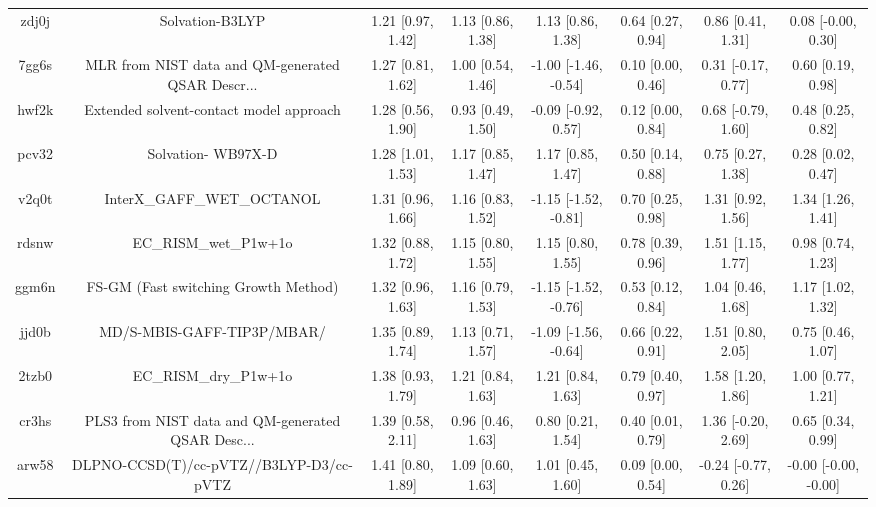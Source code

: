 \documentclass{article}
\begin{document}
\begin{center}
\begin{longtable}{|cccccccc|}
 zdj0j &                                    Solvation-B3LYP &  1.21 [0.97, 1.42] &  1.13 [0.86, 1.38] &     1.13 [0.86, 1.38] &  0.64 [0.27, 0.94] &    0.86 [0.41, 1.31] &    0.08 [-0.00, 0.30] \\
 7gg6s &  MLR from NIST data and QM-generated QSAR Descr... &  1.27 [0.81, 1.62] &  1.00 [0.54, 1.46] &  -1.00 [-1.46, -0.54] &  0.10 [0.00, 0.46] &   0.31 [-0.17, 0.77] &     0.60 [0.19, 0.98] \\
 hwf2k &            Extended solvent-contact model approach &  1.28 [0.56, 1.90] &  0.93 [0.49, 1.50] &   -0.09 [-0.92, 0.57] &  0.12 [0.00, 0.84] &   0.68 [-0.79, 1.60] &     0.48 [0.25, 0.82] \\
 pcv32 &                                 Solvation- WB97X-D &  1.28 [1.01, 1.53] &  1.17 [0.85, 1.47] &     1.17 [0.85, 1.47] &  0.50 [0.14, 0.88] &    0.75 [0.27, 1.38] &     0.28 [0.02, 0.47] \\
 v2q0t &                         InterX\_GAFF\_WET\_OCTANOL &  1.31 [0.96, 1.66] &  1.16 [0.83, 1.52] &  -1.15 [-1.52, -0.81] &  0.70 [0.25, 0.98] &    1.31 [0.92, 1.56] &     1.34 [1.26, 1.41] \\
 rdsnw &                              EC\_RISM\_wet\_P1w+1o &  1.32 [0.88, 1.72] &  1.15 [0.80, 1.55] &     1.15 [0.80, 1.55] &  0.78 [0.39, 0.96] &    1.51 [1.15, 1.77] &     0.98 [0.74, 1.23] \\
 ggm6n &               FS-GM (Fast switching Growth Method) &  1.32 [0.96, 1.63] &  1.16 [0.79, 1.53] &  -1.15 [-1.52, -0.76] &  0.53 [0.12, 0.84] &    1.04 [0.46, 1.68] &     1.17 [1.02, 1.32] \\
 jjd0b &                         MD/S-MBIS-GAFF-TIP3P/MBAR/ &  1.35 [0.89, 1.74] &  1.13 [0.71, 1.57] &  -1.09 [-1.56, -0.64] &  0.66 [0.22, 0.91] &    1.51 [0.80, 2.05] &     0.75 [0.46, 1.07] \\
 2tzb0 &                              EC\_RISM\_dry\_P1w+1o &  1.38 [0.93, 1.79] &  1.21 [0.84, 1.63] &     1.21 [0.84, 1.63] &  0.79 [0.40, 0.97] &    1.58 [1.20, 1.86] &     1.00 [0.77, 1.21] \\
 cr3hs &  PLS3 from NIST data and QM-generated QSAR Desc... &  1.39 [0.58, 2.11] &  0.96 [0.46, 1.63] &     0.80 [0.21, 1.54] &  0.40 [0.01, 0.79] &   1.36 [-0.20, 2.69] &     0.65 [0.34, 0.99] \\
 arw58 &            DLPNO-CCSD(T)/cc-pVTZ//B3LYP-D3/cc-pVTZ &  1.41 [0.80, 1.89] &  1.09 [0.60, 1.63] &     1.01 [0.45, 1.60] &  0.09 [0.00, 0.54] &  -0.24 [-0.77, 0.26] &  -0.00 [-0.00, -0.00] \\

\end{longtable}
\end{center}
\end{document}
